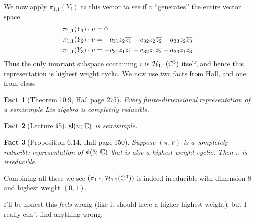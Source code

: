 \documentclass[
	pages,
	boxes,
	color=WildStrawberry
]{homework}
\theoremstyle{plain}
\newtheorem{fact}{Fact}
\begin{document}
\begin{solution}
	We now apply $\pi_{1,1}(Y_i)$ to this vector to see if $v$ ``generates'' the entire vector space.
	\begin{align*}
		\pi_{1,1}(Y_1) \cdot v & = 0                                                                \\
		\pi_{1,1}(Y_2) \cdot v & = -a_{31}z_2\overline{z_1} - a_{32}z_2\overline{z_2} - a_{33}z_2\overline{z_3} \\
		\pi_{1,1}(Y_3) \cdot v & = -a_{31}z_1\overline{z_1} - a_{32}z_1\overline{z_2} - a_{33}z_1\overline{z_3}
	\end{align*}
	Thus the only invariant subspace containing $v$ is $\mathcal{H}_{1,1}(\mathbb{C}^3)$ itself, and hence this representation is highest weight cyclic. We now use two facts from Hall, and one from class:
	\begin{fact}[Theorem 10.9, Hall page 275]
		Every finite-dimensional representation of a semisimple Lie algebra is completely reducible.
	\end{fact}
	\begin{fact}[Lecture 65]
		$\mathsf{sl}(n;\, \mathbb{C})$ is semisimple.
	\end{fact}
	\begin{fact}[Proposition 6.14, Hall page 150]
		Suppose $(\pi, V)$ is a \emph{completely reducible} representation of $\mathsf{sl}(3;\, \mathbb{C})$ that is also a highest weight cyclic. Then $\pi$ is irreducible.
	\end{fact}
	Combining all these we see $(\pi_{1,1}, \mathcal{H}_{1,1}(\mathbb{C}^3))$ is indeed irreducible with dimension $8$ and highest weight $(0, 1)$.

	I'll be honest this \emph{feels} wrong (like it should have a higher highest weight), but I really can't find anything wrong.
\end{solution}
\end{document}
